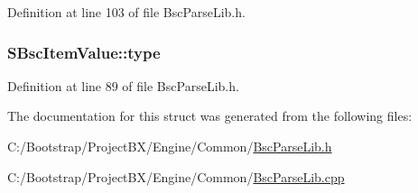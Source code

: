 Definition at line 103 of file BscParseLib.h.\hypertarget{struct_s_bsc_item_value_87ed28e13fc40257fc07fdfcaa81d39a}{
\subsubsection[{type}]{ {\bf SBscItemValue::type}}}
\label{struct_s_bsc_item_value_87ed28e13fc40257fc07fdfcaa81d39a}




Definition at line 89 of file BscParseLib.h.

The documentation for this struct was generated from the following files:\begin{CompactItemize}
\item 
C:/Bootstrap/ProjectBX/Engine/Common/\hyperlink{_bsc_parse_lib_8h}{BscParseLib.h}\item 
C:/Bootstrap/ProjectBX/Engine/Common/\hyperlink{_bsc_parse_lib_8cpp}{BscParseLib.cpp}\end{CompactItemize}
